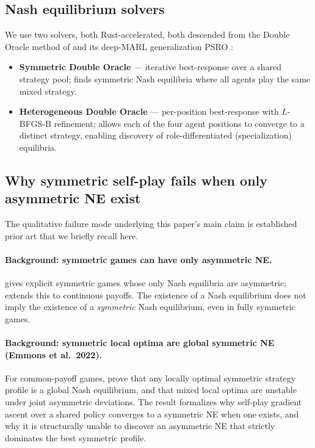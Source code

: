 \documentclass{article}
\begin{document}
\subsection{Nash equilibrium solvers}

We use two solvers, both Rust-accelerated, both descended from the Double
Oracle method of \cite{mcmahan2003planning} and its deep-MARL generalization
PSRO \cite{lanctot2017unified}:
\begin{itemize}
  \item \textbf{Symmetric Double Oracle} — iterative best-response over a
    shared strategy pool; finds symmetric Nash equilibria where all agents
    play the same mixed strategy.
  \item \textbf{Heterogeneous Double Oracle} — per-position best-response with
    $L$-BFGS-B refinement; allows each of the four agent positions to converge
    to a distinct strategy, enabling discovery of role-differentiated
    (specialization) equilibria.
\end{itemize}

\subsection{Why symmetric self-play fails when only asymmetric NE exist}
\label{sec:theory}

The qualitative failure mode underlying this paper's main claim is established
prior art that we briefly recall here.

\paragraph{Background: symmetric games can have only asymmetric NE.}
\cite{fey2012symmetric} gives explicit symmetric games whose only Nash
equilibria are asymmetric; \cite{xefteris2023continuous} extends this to
continuous payoffs.  The existence of a Nash equilibrium does not imply the
existence of a \emph{symmetric} Nash equilibrium, even in fully symmetric
games.

\paragraph{Background: symmetric local optima are global symmetric NE
(Emmons et al.\ 2022).}  For common-payoff games,
\cite{emmons2022symmetric} prove that any locally optimal symmetric strategy
profile is a global Nash equilibrium, and that mixed local optima are unstable
under joint asymmetric deviations.  The result formalizes why self-play
gradient ascent over a shared policy converges to a symmetric NE when one
exists, and why it is structurally unable to discover an asymmetric NE that
strictly dominates the best symmetric profile.
\end{document}
